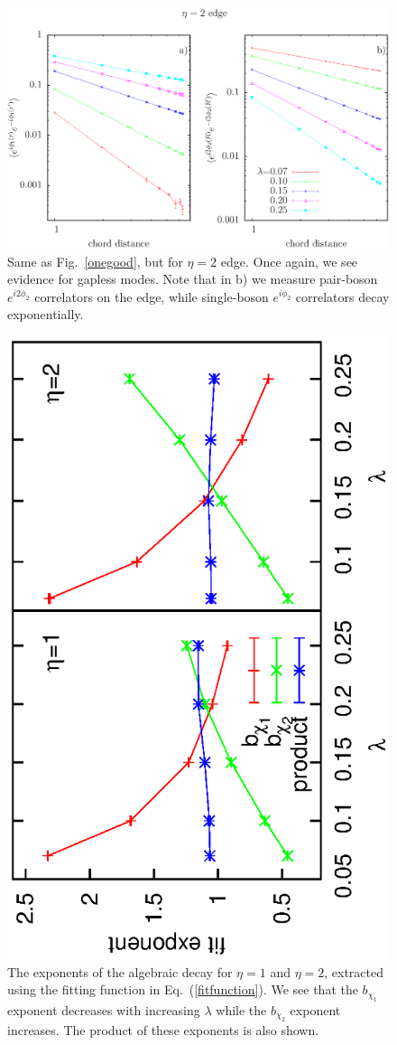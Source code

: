 \begin{figure}
\includegraphics[width=0.6\linewidth]{figures/twocord.eps}
\caption{ Same as Fig.~\ref{onegood}, but for $\eta=2$ edge. Once again, we see evidence for gapless modes. Note that in b) we measure pair-boson $e^{i 2\phi_2}$ correlators on the edge, while single-boson $e^{i\phi_2}$ correlators decay exponentially.
\label{twogood}}
\end{figure}

\begin{figure}
\includegraphics[width=0.6\linewidth,angle=-90]{figures/exp1.eps}
\caption{ The exponents of the algebraic decay for $\eta=1$ and $\eta=2$, extracted using the fitting function in Eq.~(\ref{fitfunction}). We see that the $b_{\chi_1}$ exponent decreases with increasing $\lambda$ while the $b_{\chi_2}$ exponent increases. The product of these exponents is also shown.
\label{exponents}}
\end{figure}

